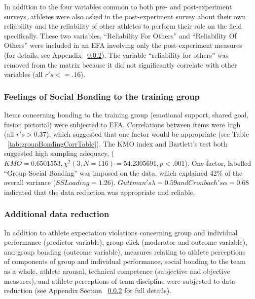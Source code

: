 \begin{landscape}
\centering

 \end{landscape}
\restoregeometry


In addition to the four variables common to both pre- and post-experiment surveys, athletes were also asked in the post-experiment survey about their own reliability and the reliability of other athletes to perform their role on the field specifically. These two variables, ``Reliability For Others'' and ``Reliability Of Others'' were included in an EFA involving only the post-experiment measures (for details, see Appendix ~\ref{}).  The variable ``reliability for others'' was removed from the matrix because it did not significantly correlate with other variables (all $r's <= .16$).

\subsubsection{Feelings of Social Bonding to the training group}
Items concerning bonding to the training group (emotional support, shared goal, fusion pictorial) were subjected to EFA.  Correlations between items were high (all $r's > 0.37$), which suggested that one factor would be appropriate (see Table ~\ref{tab:groupBondingCorrTable}). The KMO index and Bartlett's test both suggested high sampling adequacy, ($KMO =  0.6501553, \chi^2(3, N = 116) = 54.2305691, p < .001$).
One factor, labelled ``Group Social Bonding'' was imposed on the data, which explained 42\% of the overall variance ($SS Loading = 1.26$). $Guttman's \lambda = 0.59 and Cronbach's \alpha = 0.68$ indicated that the data reduction was appropriate and reliable.

\subsubsection{Additional data reduction}
In addition to athlete expectation violations concerning group and individual performance (predictor variable), group click (moderator and outcome variable), and group bonding (outcome variable), measures relating to athlete perceptions of components of group and individual performance, social bonding to the team as a whole, athlete arousal, technical competence (subjective and objective measures), and athlete perceptions of team discipline were subjected to data reduction (see Appendix Section ~\ref{} for full details).



